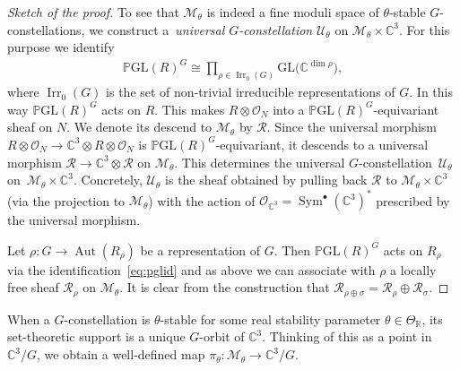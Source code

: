 \documentclass[10pt,a4paper]{amsart}
\numberwithin{equation}{section}
\newcommand{\sM}{\mathscr{M}}
\newcommand{\sO}{\mathscr{O}}
\newcommand{\sR}{\mathscr{R}}
\newcommand{\sU}{\mathscr{U}}
\newcommand{\R}{{\mathbb R}}
\newcommand{\C}{{\mathbb C}}
\newcommand{\GL}{\mathrm{GL}}
\newcommand{\PGL}{{\mathbb P}\GL}
\newcommand{\Irr}{\operatorname{Irr}}
\newcommand{\Aut}{\operatorname{Aut}}
\newcommand{\iso}{\cong}
\newcommand{\Sym}{\operatorname{Sym}}
\begin{document}
\begin{proof}[Sketch of the proof]
  To see that $\sM_{\theta}$ is indeed a f\/ine moduli space of
  $\theta$-stable $G$-constellations, we construct a~\emph{universal
    $G$-constellation} $\sU_\theta$ on $\sM_\theta\times \C^3$.  For
  this purpose we identify
  \begin{gather}\label{eq:pglid}
    \PGL(R)^G \iso \prod_{\rho \in \Irr_0(G)}\GL\big(\C^{\dim\rho}\big),
  \end{gather}
  where $\Irr_0(G)$ is the set of non-trivial irreducible
  representations of $G$.  In this way $\PGL(R)^G$ acts on $R$.  This
  makes $R\otimes\sO_N$ into a $\PGL(R)^G$-equivariant sheaf on $N$.
  We denote its descend to $\sM_\theta$ by $\sR$.  Since the universal
  morphism $R\otimes\sO_N \to \C^3\otimes R\otimes\sO_N$ is
  $\PGL(R)^G$-equivariant, it descends to a universal morphism $\sR
  \to \C^3\otimes \sR$ on $\sM_{\theta}$. This determines the
  universal $G$-constella\-tion~$\sU_{\theta}$ on~$\sM_\theta\times\C^3$.
  Concretely, $\sU_\theta$ is the sheaf obtained by pulling back $\sR$ to $\sM_\theta\times\C^3$ (via the projection to $\sM_\theta$) with the action of $\sO_{\C^3}=\Sym^\bullet(\C^3)^*$ prescribed by the universal morphism.

  Let $\rho\colon G \to \Aut(R_{\rho})$ be a representation of $G$.  Then
  $\PGL(R)^G$ acts on $R_\rho$ via the identif\/ication~\eqref{eq:pglid}
  and as above we can associate with $\rho$ a locally free sheaf
  $\sR_{\rho}$ on $\sM_\theta$.  It is clear from the construction
  that $\sR_{\rho\oplus\sigma}=\sR_\rho\oplus\sR_\sigma$.
\end{proof}

\begin{Remark}\label{rem:map}
  When a $G$-constellation is $\theta$-stable for some real
  stability parameter $\theta \in \Theta_\R$, its set-theoretic
  support is a unique $G$-orbit of $\C^3$. Thinking of this as a
  point in $\C^3/G$, we obtain a well-def\/ined map $\pi_{\theta}\colon
  \sM_{\theta} \to \C^3/G$.
\end{Remark}
\end{document}
